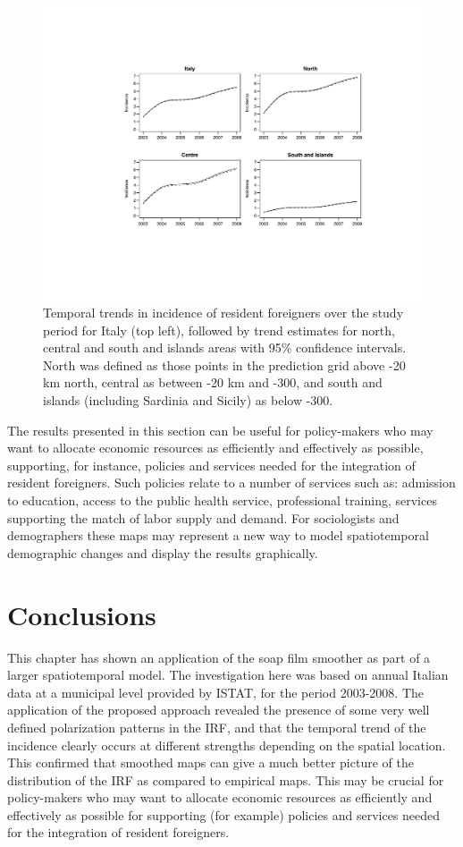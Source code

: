 \begin{figure}[t]
	\centering
		\includegraphics[width=\textwidth]{it/trends.pdf}
	\caption{Temporal trends in incidence of resident foreigners over the study period for Italy (top left), followed by trend estimates for north, central and south and islands areas with 95\% confidence intervals. North was defined as those points in the prediction grid above -20 km north, central as between -20 km and -300, and south and islands (including Sardinia and Sicily) as below -300.}
	\label{trends}
\end{figure}

The results presented in this section can be useful for policy-makers who may want to allocate economic resources as efficiently and effectively as possible, supporting, for instance, policies and services needed for the integration of resident foreigners. Such policies relate to a number of services such as: admission to education, access to the public health service, professional training, services supporting the match of labor supply and demand. For sociologists and demographers these maps may represent a new way to model spatiotemporal demographic changes and display the results graphically. 

\section{Conclusions}

This chapter has shown an application of the soap film smoother as part of a larger spatiotemporal model. The investigation here was based on annual Italian data at a municipal level provided by ISTAT, for the period 2003-2008. The application of the proposed approach revealed the presence of some very well defined polarization patterns in the IRF, and that the temporal trend of the incidence clearly occurs at different strengths depending on the spatial location. This confirmed that smoothed maps can give a much better picture of the distribution of the IRF as compared to empirical maps. This may be crucial for policy-makers who may want to allocate economic resources as efficiently and effectively as possible for supporting (for example) policies and services needed for the integration of resident foreigners.


